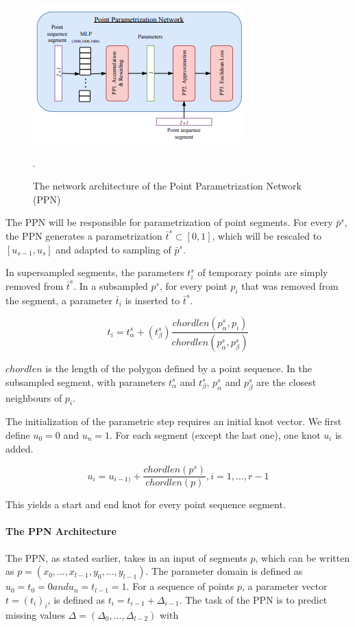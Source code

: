 \begin{figure}[h]
	\centering
	\includegraphics[scale=0.75]{images/chap05-methodology/ppn.png}
	\caption{The network architecture of the Point Parametrization Network (PPN)}.
	\label{fig:ppn}
\end{figure}

The PPN will be responsible for parametrization of point segments. For every $\bar{p}^{s}$, the PPN generates a parametrization $\bar{t}^{s} \subset [0, 1]$, which will be rescaled to $[u_{s - 1}, u_{s}]$ and adapted to sampling of $\bar{p}^{s}$.

In supersampled segments, the parameters $t^{s}_{i}$ of temporary points are simply removed from $\bar{t}^{s}$. In a subsampled $p^{s}$, for every point $p_{i}$ that was removed from the segment, a parameter $\bar{t}_{i}$ is inserted to $\bar{t}^{s}$.

$$ t_{i} = t^{s}_{\alpha} + (t^{s}_{\beta})\frac{chordlen(p^{s}_{\alpha}, p_{i})}{chordlen(p^{s}_{\alpha}, p^{s}_{\beta})} $$

$chordlen$ is the length of the polygon defined by a point sequence. In the subsampled segment, with parameters $t^{s}_{\alpha}$ and $t^{s}_{\beta}$, $p^{s}_{\alpha}$ and $p^{s}_{\beta}$ are the closest neighbours of $p_{i}$.

The initialization of the parametric step requires an initial knot vector. We first define $u_{0} = 0$ and $u_{n} = 1$. For each segment (except the last one), one knot $u_{i}$ is added.

$$ u_{i} = u_{i - 1)} + \frac{chordlen(p^{s})}{chordlen(p)}, i = 1, \ldots, r -1 $$
	
This yields a start and end knot for every point sequence segment.

\paragraph{The PPN Architecture}
The PPN, as stated earlier, takes in an input of segments $p$, which can be written as $p = (x_{0}, \ldots, x_{l - 1}, y_{0}, \ldots, y_{l - 1})$. The parameter domain is defined as $u_{0} = t_{0} = 0 and u_{n} = t_{l - 1} = 1$. For a sequence of points $p$, a parameter vector $t = (t_{i})_{i}$, is defined as $t_{i} = t_{i - 1} + \Delta_{i - 1}$. The task of the PPN is to predict missing values $\Delta = (\Delta_{0}, \ldots, \Delta_{l - 2})$ with

